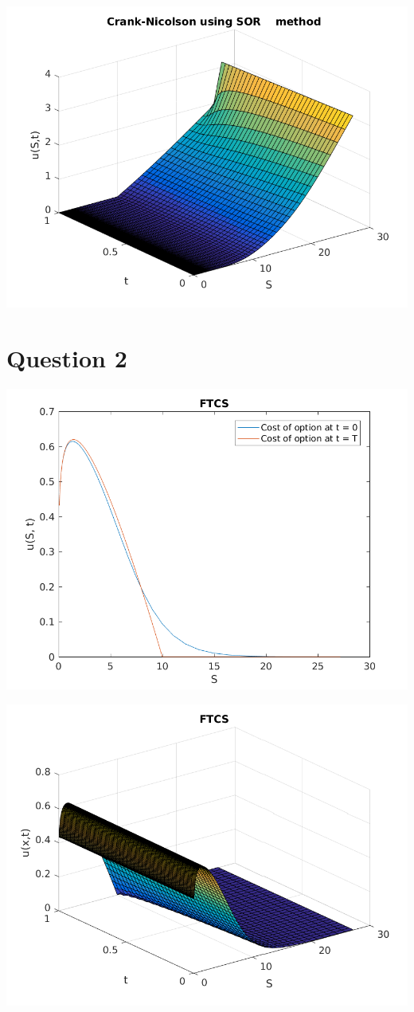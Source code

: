 \documentclass{article}
\begin{document}
\includegraphics{"q1_18"}
\pagebreak

\section{Question 2}

\includegraphics{"q2_1"}
\pagebreak


\includegraphics{"q2_2"}
\pagebreak
\end{document}
